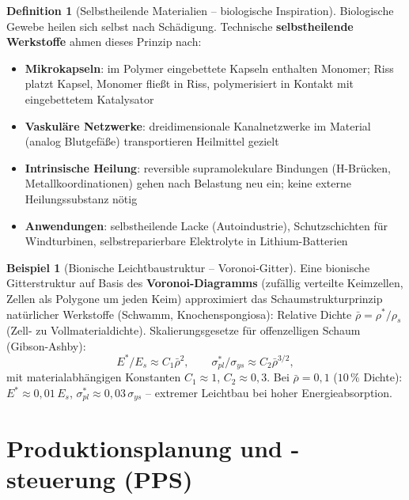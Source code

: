 ﻿\documentclass[a4paper,12pt]{report}
\theoremstyle{definition}
\newtheorem{definition}{Definition}
\newtheorem{beispiel}{Beispiel}
\begin{document}
\begin{definition}[Selbstheilende Materialien -- biologische Inspiration]
Biologische Gewebe heilen sich selbst nach Schädigung. Technische
\textbf{selbstheilende Werkstoffe} ahmen dieses Prinzip nach:
\begin{itemize}
    \item[-] \textbf{Mikrokapseln}: im Polymer eingebettete Kapseln
          enthalten Monomer; Riss platzt Kapsel, Monomer fließt in Riss,
          polymerisiert in Kontakt mit eingebettetem Katalysator
    \item[-] \textbf{Vaskuläre Netzwerke}: dreidimensionale Kanalnetzwerke
          im Material (analog Blutgefäße) transportieren Heilmittel gezielt
    \item[-] \textbf{Intrinsische Heilung}: reversible supramolekulare Bindungen
          (H-Brücken, Metallkoordinationen) gehen nach Belastung neu ein;
          keine externe Heilungssubstanz nötig
    \item[-] \textbf{Anwendungen}: selbstheilende Lacke (Autoindustrie),
          Schutzschichten für Windturbinen, selbstreparierbare Elektrolyte
          in Lithium-Batterien
\end{itemize}
\end{definition}

\begin{beispiel}[Bionische Leichtbaustruktur -- Voronoi-Gitter]
Eine bionische Gitterstruktur auf Basis des \textbf{Voronoi-Diagramms}
(zufällig verteilte Keimzellen, Zellen als Polygone um jeden Keim)
approximiert das Schaumstrukturprinzip natürlicher Werkstoffe (Schwamm, Knochenspongiosa):
Relative Dichte $\bar{\rho} = \rho^*/\rho_s$ (Zell- zu Vollmaterialdichte).
Skalierungsgesetze für offenzelligen Schaum (Gibson-Ashby):
\[
  E^*/E_s \approx C_1 \bar{\rho}^2, \qquad \sigma_{pl}^*/\sigma_{ys} \approx C_2 \bar{\rho}^{3/2},
\]
mit materialabhängigen Konstanten $C_1 \approx 1$, $C_2 \approx 0{,}3$.
Bei $\bar{\rho} = 0{,}1$ ($10\,\%$ Dichte): $E^* \approx 0{,}01\,E_s$,
$\sigma_{pl}^* \approx 0{,}03\,\sigma_{ys}$ -- extremer Leichtbau bei hoher Energieabsorption.
\end{beispiel}


\section{Produktionsplanung und -steuerung (PPS)}
\end{document}
